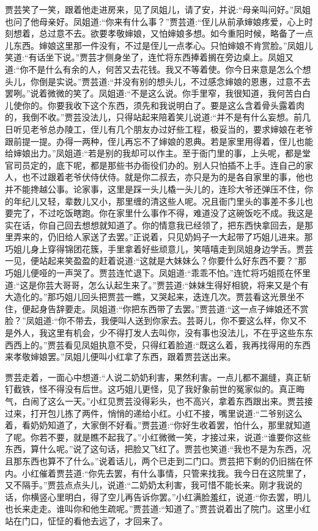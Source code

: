 \begin{parag}
    贾芸笑了一笑，跟着他走进房来，见了凤姐儿，请了安，并说:“母亲叫问好。”凤姐也问了他母亲好。凤姐道:“你来有什么事？”贾芸道:“侄儿从前承婶娘疼爱，心上时刻想着，总过意不去。欲要孝敬婶娘，又怕婶娘多想。如今重阳时候，略备了一点儿东西。婶娘这里那一件没有，不过是侄儿一点孝心。只怕婶娘不肯赏脸。”凤姐儿笑道:“有话坐下说。”贾芸才侧身坐了，连忙将东西捧着搁在旁边桌上。凤姐又道:“你不是什么有余的人，何苦又去花钱。我又不等着使。你今日来意是怎么个想头儿，你倒是实说。”贾芸道:“并没有别的想头儿，不过感念婶娘的恩惠，过意不去罢咧。”说着微微的笑了。凤姐道:“不是这么说。你手里窄，我很知道，我何苦白白儿使你的。你要我收下这个东西，须先和我说明白了。要是这么含着骨头露着肉的，我倒不收。”贾芸没法儿，只得站起来陪着笑儿说道:“并不是有什么妄想。前几日听见老爷总办陵工，侄儿有几个朋友办过好些工程，极妥当的，要求婶娘在老爷跟前提一提。办得一两种，侄儿再忘不了婶娘的恩典。若是家里用得着，侄儿也能给婶娘出力。”凤姐道:“若是别的我却可以作主。至于衙门里的事，上头呢，都是堂官司员定的，底下呢，都是那些书办衙役们办的。别人只怕插不上手。连自己的家人，也不过跟着老爷伏侍伏侍。就是你二叔去，亦只是为的是各自家里的事，他也并不能搀越公事。论家事，这里是踩一头儿橇一头儿的，连珍大爷还弹压不住，你的年纪儿又轻，辈数儿又小，那里缠的清这些人呢。况且衙门里头的事差不多儿也要完了，不过吃饭瞎跑。你在家里什么事作不得，难道没了这碗饭吃不成。我这是实在话，你自己回去想想就知道了。你的情意我已经领了，把东西快拿回去，是那里弄来的，仍旧给人家送了去罢。”正说着，只见奶妈子一大起带了巧姐儿进来。那巧姐儿身上穿得锦团花簇，手里拿着好些顽意儿，笑嘻嘻走到凤姐身边学舌。贾芸一见，便站起来笑盈盈的赶着说道:“这就是大妹妹么？你要什么好东西不要？”那巧姐儿便哑的一声哭了。贾芸连忙退下。凤姐道:“乖乖不怕。”连忙将巧姐揽在怀里道:“这是你芸大哥哥，怎么认起生来了。”贾芸道:“妹妹生得好相貌，将来又是个有大造化的。”那巧姐儿回头把贾芸一瞧，又哭起来，迭连几次。贾芸看这光景坐不住，便起身告辞要走。凤姐道:“你把东西带了去罢。”贾芸道:“这一点子婶娘还不赏脸？”凤姐道:“你不带去，我便叫人送到你家去。芸哥儿，你不要这么样，你又不是外人，我这里有机会，少不得打发人去叫你，没有事也没法儿，不在乎这些东东西西上的。”贾芸看见凤姐执意不受，只得红着脸道:“既这么着，我再找得用的东西来孝敬婶娘罢。”凤姐儿便叫小红拿了东西，跟着贾芸送出来。
\end{parag}


\begin{parag}
    贾芸走着，一面心中想道:“人说二奶奶利害，果然利害。一点儿都不漏缝，真正斩钉截铁，怪不得没有后世。这巧姐儿更怪，见了我好象前世的冤家似的。真正晦气，白闹了这么一天。”小红见贾芸没得彩头，也不高兴，拿着东西跟出来。贾芸接过来，打开包儿拣了两件，悄悄的递给小红。小红不接，嘴里说道:“二爷别这么着，看奶奶知道了，大家倒不好看。”贾芸道:“你好生收着罢，怕什么，那里就知道了呢。你若不要，就是瞧不起我了。”小红微微一笑，才接过来，说道:“谁要你这些东西，算什么呢。”说了这句话，把脸又飞红了。贾芸也笑道:“我也不是为东西，况且那东西也算不了什么。”说着话儿，两个已走到二门口。贾芸把下剩的仍旧揣在怀内。小红催着贾芸道:“你先去罢，有什么事情，只管来找我。我今日在这院里了，又不隔手。”贾芸点点头儿，说道:“二奶奶太利害，我可惜不能长来。刚才我说的话，你横竖心里明白，得了空儿再告诉你罢。”小红满脸羞红，说道:“你去罢，明儿也长来走走。谁叫你和他生疏呢。”贾芸道:“知道了。”贾芸说着出了院门。这里小红站在门口，怔怔的看他去远了，才回来了。
\end{parag}


